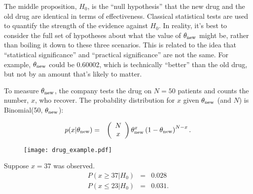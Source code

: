 \documentclass[a4paper, 12pt]{article}
\begin{document}
The middle proposition, $H_0$,
is the ``null hypothesis'' that the new drug and the
old drug are identical in terms of effectiveness. Classical statistical tests
are used to quantify the strength of the evidence against $H_0$. In reality,
it's best to consider the full set of hypotheses about what the value of
$\theta_{\rm new}$ might be, rather than boiling it down to these three
scenarios. This is related to the idea
that ``statistical significance'' and ``practical significance'' are not the
same. For example, $\theta_{\rm new}$ could be 0.60002, which is
technically ``better'' than the old drug, but not by an amount that's likely
to matter.

To measure $\theta_{\rm new}$, the company tests the drug on $N=50$ patients
and counts the number, $x$, who recover. The probability distribution for
$x$ given $\theta_{\rm new}$ (and $N$) is Binomial(50, $\theta_{\rm new}$):

\begin{eqnarray}
p(x | \theta_{\rm new}) &=&
\left(\begin{array}{cc}N \\ x\end{array}\right)
\theta_{\rm new}^x \left(1 - \theta_{\rm new}\right)^{N - x}.
\end{eqnarray}

\begin{figure}[ht!]
\centering
\texttt{[image: drug\_example.pdf]}
\caption{\label{fig:drug_example}}
\end{figure}

Suppose $x=37$ was observed.
\begin{eqnarray}
P(x \geq 37 | H_0) &=& 0.028\\
P(x \leq 23 | H_0) &=& 0.031.
\end{eqnarray}
\end{document}

